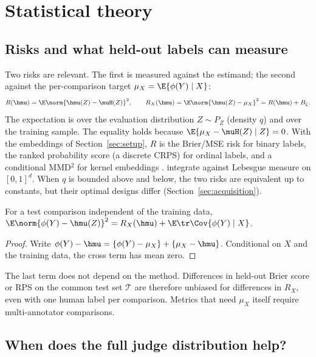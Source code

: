 \section{Statistical theory}
\label{sec:theory}

\subsection{Risks and what held-out labels can measure}

Two risks are relevant. The first is measured against the estimand; the second against the
per-comparison target $\mu_X=\E\{\phi(Y)\mid X\}$:
\[
  R(\hmu)=\E\norm{\hmu(Z)-\muH(Z)}^2,\qquad
  R_X(\hmu)=\E\norm{\hmu(Z)-\mu_X}^2=R(\hmu)+B_\zeta .
\]
The expectation is over the evaluation distribution $Z\sim P_Z$ (density $q$) and over the training
sample. The equality holds because $\E\{\mu_X-\muH(Z)\mid Z\}=0$. With the embeddings of
Section~\ref{sec:setup}, $R$ is the Brier/MSE risk for binary labels, the ranked probability score (a
discrete CRPS) for ordinal labels, and a conditional MMD$^2$ for kernel embeddings
\citep{gneiting2007strictly,muandet2017kernel}. \citet{li2026personalizing} integrate against
Lebesgue measure on $[0,1]^d$. When $q$ is bounded above and below, the two risks are equivalent up to
constants, but their optimal designs differ (Section~\ref{sec:acquisition}).

\begin{lemma}
\label{lem:heldout}
For a test comparison independent of the training data,
$\E\norm{\phi(Y)-\hmu(Z)}^2=R_X(\hmu)+\E\tr\Cov\{\phi(Y)\mid X\}$.
\end{lemma}

\begin{proof}
Write $\phi(Y)-\hmu=\{\phi(Y)-\mu_X\}+\{\mu_X-\hmu\}$. Conditional on $X$ and the training data, the
cross term has mean zero.
\end{proof}

The last term does not depend on the method. Differences in held-out Brier score or RPS on the
common test set $\mathcal T$ are therefore unbiased for differences in $R_X$, even with one human
label per comparison. Metrics that need $\mu_X$ itself require multi-annotator comparisons.

\subsection{When does the full judge distribution help?}
\label{sec:scalar-vs-dist}


